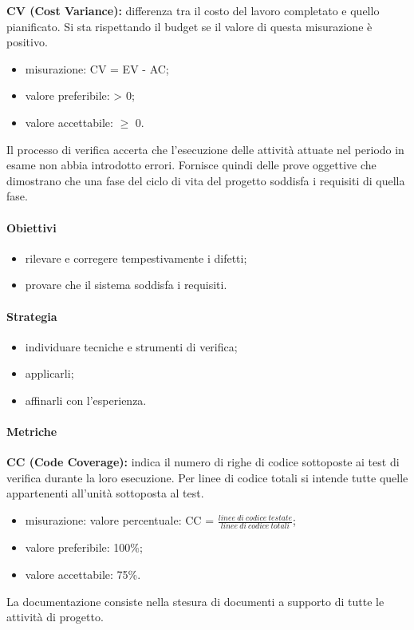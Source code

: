 \textbf{CV (Cost Variance):} differenza tra il costo del lavoro completato e quello pianificato. Si sta rispettando il budget se il valore di questa misurazione 
è positivo.
\begin{itemize}
    \item misurazione: CV = EV - AC;
    \item valore preferibile: > 0;
    \item valore accettabile: $\geq$ 0.
\end{itemize}
Il processo di verifica accerta che l'esecuzione delle attività attuate nel periodo in esame non abbia introdotto errori.
Fornisce quindi delle prove oggettive che dimostrano che una fase del ciclo di vita del progetto soddisfa i requisiti di quella fase.
\paragraph{Obiettivi}
\begin{itemize}
    \item rilevare e corregere tempestivamente i difetti;
    \item provare che il sistema soddisfa i requisiti.
\end{itemize}
\paragraph{Strategia}
\begin{itemize}
    \item individuare tecniche e strumenti di verifica;
    \item applicarli;
    \item affinarli con l'esperienza.
\end{itemize}
\paragraph{Metriche}
\textbf{CC (Code Coverage):} indica il numero di righe di codice sottoposte ai test di verifica durante la loro esecuzione. Per linee di codice totali 
si intende tutte quelle appartenenti all'unità sottoposta al test.
\begin{itemize}
    \item misurazione: valore percentuale: CC = $\frac{linee \ di \ codice \ testate}{linee \ di \ codice \ totali}$;
    \item valore preferibile: 100\%;
    \item valore accettabile: 75\%.
\end{itemize}
La documentazione consiste nella stesura di documenti a supporto di tutte le attività di progetto.
